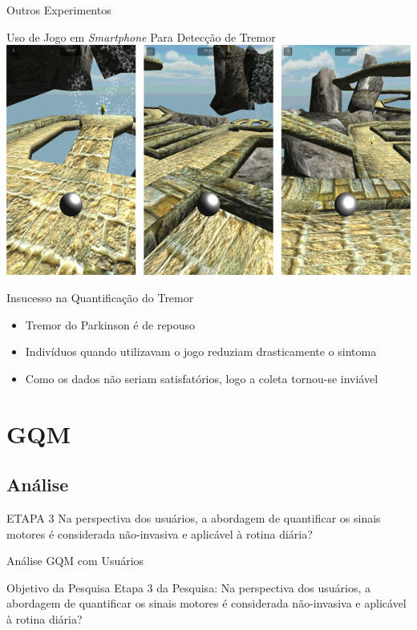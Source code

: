 \documentclass{beamer}
\begin{document}
\begin{frame}{Outros Experimentos}
	\begin{block}{Uso de Jogo em \textit{Smartphone} Para Detecção de Tremor}
	\center \includegraphics[height=1 in]{img/pinball_world.png}
	\end{block}
	\begin{block}{Insucesso na Quantificação do Tremor}
			\begin{itemize}
			\item Tremor do Parkinson é de repouso
			\item Indivíduos quando utilizavam o jogo reduziam drasticamente o sintoma
			\item Como os dados não seriam satisfatórios, logo a coleta tornou-se inviável
		\end{itemize}
	\end{block}
\end{frame}






\section{GQM}

\subsection{Análise}
\begin{frame}
  \begin{block}{ETAPA 3}
   Na perspectiva dos usuários, a abordagem de quantificar os sinais motores é considerada não-invasiva e aplicável à rotina diária?
  \end{block}
\end{frame}

\begin{frame}{Análise GQM com Usuários} 
    \begin{block}{Objetivo da Pesquisa}
      Etapa 3 da Pesquisa: Na perspectiva dos usuários, a abordagem de quantificar os sinais motores é considerada não-invasiva e aplicável à rotina diária?
    \end{block}
\end{frame} 
\end{document}
